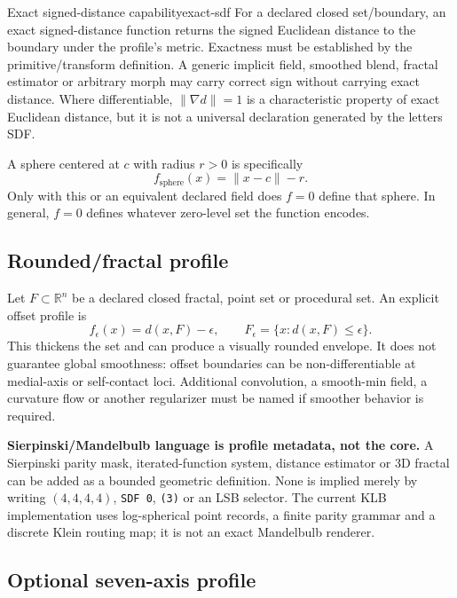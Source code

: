 \documentclass[10pt,a4paper]{article}
\newcommand{\Real}{\mathbb{R}}
\newcommand{\code}[1]{\texttt{#1}}
\begin{document}
\begin{formaldef}{Exact signed-distance capability}{exact-sdf}
For a declared closed set/boundary, an exact signed-distance function returns the signed Euclidean distance to the boundary under the profile’s metric. Exactness must be established by the primitive/transform definition. A generic implicit field, smoothed blend, fractal estimator or arbitrary morph may carry correct sign without carrying exact distance. Where differentiable, \(\|\nabla d\|=1\) is a characteristic property of exact Euclidean distance, but it is not a universal declaration generated by the letters SDF.
\end{formaldef}

A sphere centered at \(c\) with radius \(r>0\) is specifically
\[
f_{\mathrm{sphere}}(x)=\|x-c\|-r.
\]
Only with this or an equivalent declared field does \(f=0\) define that sphere. In general, \(f=0\) defines whatever zero-level set the function encodes.

\subsection{Rounded/fractal profile}

Let \(F\subset\Real^n\) be a declared closed fractal, point set or procedural set. An explicit offset profile is
\[
f_\epsilon(x)=d(x,F)-\epsilon,
\qquad F_\epsilon=\{x:d(x,F)\le\epsilon\}.
\]
This thickens the set and can produce a visually rounded envelope. It does not guarantee global smoothness: offset boundaries can be non-differentiable at medial-axis or self-contact loci. Additional convolution, a smooth-min field, a curvature flow or another regularizer must be named if smoother behavior is required.

\begin{boundarybox}
\textbf{Sierpinski/Mandelbulb language is profile metadata, not the core.} A Sierpinski parity mask, iterated-function system, distance estimator or 3D fractal can be added as a bounded geometric definition. None is implied merely by writing \((4,4,4,4)\), \code{SDF 0}, \code{(3)} or an LSB selector. The current KLB implementation uses log-spherical point records, a finite parity grammar and a discrete Klein routing map; it is not an exact Mandelbulb renderer.
\end{boundarybox}

\subsection{Optional seven-axis profile}
\end{document}
